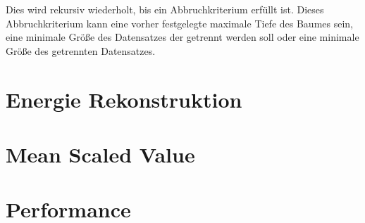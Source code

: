 Dies wird rekursiv wiederholt, bis ein Abbruchkriterium erfüllt ist. Dieses Abbruchkriterium kann eine vorher festgelegte maximale Tiefe des Baumes sein,
eine minimale Größe des Datensatzes der getrennt werden soll oder eine minimale Größe des getrennten Datensatzes.
\section{Energie Rekonstruktion}

\section{Mean Scaled Value}


\section{Performance}
